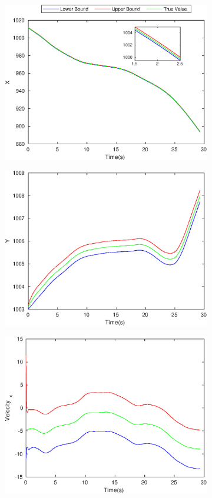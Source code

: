 \begin{figure}[!h]
\begin{subfigure}{.5\linewidth}
\centering
\includegraphics[width=\linewidth]{figures/Frad/s3caSMX}
\end{subfigure}
\begin{subfigure}{.5\linewidth}
\centering
\includegraphics[width=\linewidth]{figures/Frad/s3caSMY}
\end{subfigure}
\begin{subfigure}{.5\linewidth}
\centering
\includegraphics[width=.9\linewidth]{figures/Frad/s3caSMVelocity_x}

\end{subfigure}
\end{figure}
